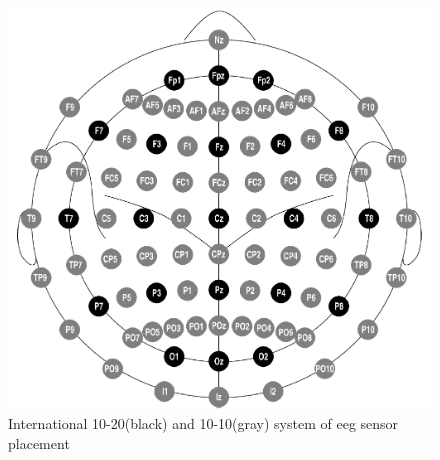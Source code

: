 \begin{figure}[htb]
	\centering
	\includegraphics[width=1\linewidth]{fig/system10-10.png}
	\caption[Caption for LOF]{International 10-20(black) and 10-10(gray) system of \gls{eeg} sensor placement\cite{placeSys}}
	\label{fig:system1010}
\end{figure}

